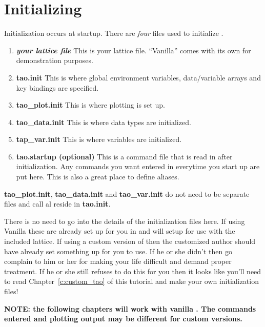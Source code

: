 \section{Initializing \tao}
\label{s:initializing}

Initialization occurs at startup. There are \emph{four} files used to initialize \tao.
  \vspace*{-3ex}
\begin{enumerate}
  \item \textbf{\textit{your lattice file}} \Newline
    This is your lattice file. ``Vanilla'' \tao comes with its own for
demonstration purposes.
  \item \textbf{tao.init} \Newline 
    This is where global environment variables, data/variable
arrays and key bindings are specified.
  \item \textbf{tao\_plot.init} \Newline
    This is where plotting is set up.
  \item \textbf{tao\_data.init} \Newline
    This is where data types are initialized.
  \item \textbf{tap\_var.init} \Newline
    This is where variables are initialized.
  \item \textbf{tao.startup (optional)} \Newline
    This is a command file that is read in after initialization. Any commands you
want entered in \tao everytime you start up are put here. This is also a great
place to define aliases.
\end{enumerate}
\textbf{tao\_plot.init}, \textbf{tao\_data.init} and \textbf{tao\_var.init} do
not need to be separate files and call al reside in \textbf{tao.init}.

There is no need to go into the details of the initialization files here. If
using Vanilla \tao these are already set up for you in  and
will setup \tao for use with the included \cesr lattice. If using a custom
version of \tao then the customized \tao author should have already set
something up for you to use. If he or she didn't then go complain to him or her
for making your life difficult and demand proper treatment. If he or she still
refuses to do this for you then it looks like you'll need to read
Chapter~\ref{c:custom_tao} of this tutorial and make your own initialization
files!

\textbf{NOTE: the following chapters will work with vanilla \tao. The commands
entered and plotting output may be different for custom versions.}



